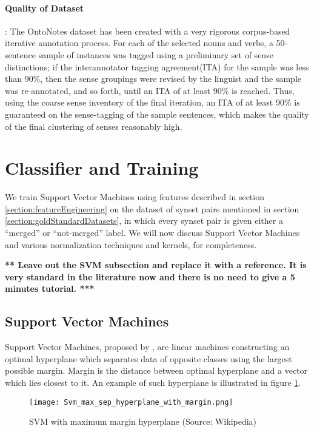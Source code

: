 \paragraph{Quality of Dataset}:
The OntoNotes dataset has been created with a very rigorous corpus-based iterative annotation process. For each of the selected nouns and verbs, a 50-sentence sample of instances was tagged using a preliminary set of sense distinctions; if the interannotator tagging agreement(ITA) for the sample was less than 90\%, then the sense groupings were revised by the linguist and the sample was re-annotated, and so forth, until an ITA of at least 90\% is reached. Thus, using the coarse sense inventory of the final iteration, an ITA of at least 90\% is guaranteed on the sense-tagging of the sample sentences, which makes the quality of the final clustering of senses reasonably high.

\section{Classifier and Training}
\label{sec:ClassifierAndTraining}
We train Support Vector Machines using features described in section \ref{section:featureEngineering} on the dataset of synset pairs mentioned in section \ref{section:goldStandardDatasets}, in which every synset pair is given either a ``merged'' or ``not-merged'' label. We will now discuss Support Vector Machines and various normalization techniques and kernels, for completeness.

{\bf *** Leave out the SVM subsection and replace it with a reference.
It is very standard in the literature now and there is no need to 
give a 5 minutes tutorial. ***}

\subsection{Support Vector Machines}
Support Vector Machines, proposed by \citep{vapnikSVM:95}, are linear machines constructing an optimal hyperplane which separates data of opposite classes using the largest possible margin. Margin is the distance between optimal hyperplane and a vector which lies closest to it. An example of such hyperplane is illustrated in figure \ref{fig:svm}. 

\begin{figure}[h]
\begin{center}
\texttt{[image: Svm\_max\_sep\_hyperplane\_with\_margin.png]}
\caption{SVM with maximum margin hyperplane (Source: Wikipedia)}
\label{fig:svm}
\end{center}
\end{figure}

